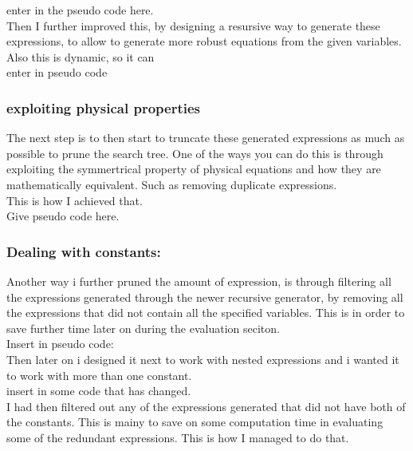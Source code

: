 \documentclass{article}
\begin{document}
enter in the pseudo code here.\\ 

Then I further improved this, by designing a resursive way to generate these expressions, to allow to generate more robust equations from the given variables. Also this is dynamic, so it can \\

enter in pseudo code\\

\subsubsection{exploiting physical properties}

The next step is to then start to truncate these generated expressions as much as possible to prune the search tree. One of the ways you can do this is through exploiting the symmertrical property of physical equations and how they are mathematically equivalent. Such as removing duplicate expressions.\\ 

This is how I achieved that.\\
Give pseudo code here. \\ 

\subsubsection{ Dealing with constants: }

Another way i further pruned the amount of expression, is through filtering all the expressions generated through the newer recursive generator, by removing all the expressions that did not contain all the specified variables. This is in order to save further time later on during the evaluation seciton.\\ 

Insert in pseudo code:\\

Then later on i designed it next to work with nested expressions and i wanted it to work with more than one constant.\\

insert in some code that has changed.\\

I had then filtered out any of the expressions generated that did not have both of the constants. This is mainy to save on some computation time in evaluating some of the redundant expressions. This is how I managed to do that. \\
\end{document}
